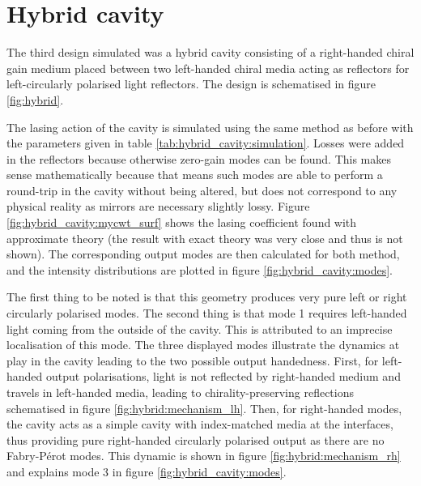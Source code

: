 \section{Hybrid cavity}

The third design simulated was a hybrid cavity consisting of a right-handed chiral gain medium placed between two left-handed chiral media acting as reflectors for left-circularly polarised light reflectors. The design is schematised in figure \ref{fig:hybrid}.

The lasing action of the cavity is simulated using the same method as before with the parameters given in table \ref{tab:hybrid_cavity:simulation}. Losses were added in the reflectors because otherwise zero-gain modes can be found. This makes sense mathematically because that means such modes are able to perform a round-trip in the cavity without being altered, but does not correspond to any physical reality as mirrors are necessary slightly lossy. Figure \ref{fig:hybrid_cavity:mycwt_surf} shows the lasing coefficient found with approximate theory (the result with exact theory was very close and thus is not shown). The corresponding output modes are then calculated for both method, and the intensity distributions are plotted in figure \ref{fig:hybrid_cavity:modes}.

The first thing to be noted is that this geometry produces very pure left or right circularly polarised modes. The second thing is that mode 1 requires left-handed light coming from the outside of the cavity. This is attributed to an imprecise localisation of this mode. The three displayed modes illustrate the dynamics at play in the cavity leading to the two possible output handedness. First, for left-handed output polarisations, light is not reflected by right-handed medium and travels in left-handed media, leading to chirality-preserving reflections schematised in figure \ref{fig:hybrid:mechanism_lh}. Then, for right-handed modes, the cavity acts as a simple cavity\cite{topf_modes_2014} with index-matched media at the interfaces, thus providing pure right-handed circularly polarised output as there are no Fabry-Pérot modes. This dynamic is  shown in figure \ref{fig:hybrid:mechanism_rh} and explains mode 3 in figure \ref{fig:hybrid_cavity:modes}.


